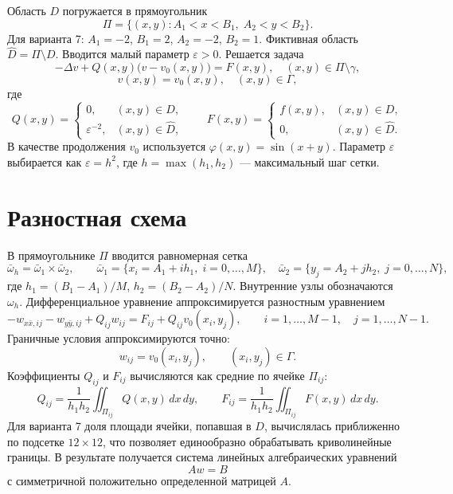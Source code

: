 \documentclass[12pt,a4paper]{article}
\begin{document}
Область \(D\) погружается в прямоугольник
\[
\Pi = \{(x,y): A_1<x<B_1,\; A_2<y<B_2\}.
\]
Для варианта 7: \(A_1=-2\), \(B_1=2\), \(A_2=-2\), \(B_2=1\). Фиктивная область \(\hat D = \Pi\setminus D\). Вводится малый параметр \(\varepsilon>0\). Решается задача
\begin{equation}
-\Delta v + Q(x,y)\bigl(v-v_0(x,y)\bigr) = F(x,y), \quad (x,y)\in\Pi\setminus\gamma,
\label{eq:fict}
\end{equation}
\[
v(x,y)=v_0(x,y),\quad (x,y)\in\Gamma,
\]
где
\[
Q(x,y)=
\begin{cases}
0, & (x,y)\in D,\\[2mm]
\varepsilon^{-2}, & (x,y)\in\hat D,
\end{cases}
\qquad
F(x,y)=
\begin{cases}
f(x,y), & (x,y)\in D,\\[2mm]
0, & (x,y)\in\hat D.
\end{cases}
\]
В качестве продолжения \(v_0\) используется \(\varphi(x,y)=\sin(x+y)\). Параметр \(\varepsilon\) выбирается как \(\varepsilon=h^2\), где \(h=\max(h_1,h_2)\) — максимальный шаг сетки.

\section{Разностная схема}

В прямоугольнике \(\Pi\) вводится равномерная сетка
\[
\bar\omega_h = \bar\omega_1\times\bar\omega_2,\qquad
\bar\omega_1=\{x_i=A_1+ih_1,\; i=0,\dots,M\},\quad
\bar\omega_2=\{y_j=A_2+jh_2,\; j=0,\dots,N\},
\]
где \(h_1=(B_1-A_1)/M\), \(h_2=(B_2-A_2)/N\). Внутренние узлы обозначаются \(\omega_h\). Дифференциальное уравнение аппроксимируется разностным уравнением
\begin{equation}
-w_{x\bar x,ij} - w_{y\bar y,ij} + Q_{ij}w_{ij}
= F_{ij} + Q_{ij}v_0(x_i,y_j),
\qquad i=1,\dots,M-1,\quad j=1,\dots,N-1.
\label{eq:scheme}
\end{equation}
Граничные условия аппроксимируются точно:
\[
w_{ij}=v_0(x_i,y_j),\qquad (x_i,y_j)\in\Gamma.
\]
Коэффициенты \(Q_{ij}\) и \(F_{ij}\) вычисляются как средние по ячейке \(\Pi_{ij}\):
\[
Q_{ij}=\frac{1}{h_1h_2}\iint_{\Pi_{ij}}Q(x,y)\,dx\,dy,\qquad
F_{ij}=\frac{1}{h_1h_2}\iint_{\Pi_{ij}}F(x,y)\,dx\,dy.
\]
Для варианта 7 доля площади ячейки, попавшая в \(D\), вычислялась приближенно по подсетке \(12\times12\), что позволяет единообразно обрабатывать криволинейные границы. В результате получается система линейных алгебраических уравнений
\begin{equation}
Aw=B
\label{eq:system}
\end{equation}
с симметричной положительно определенной матрицей \(A\).
\end{document}
